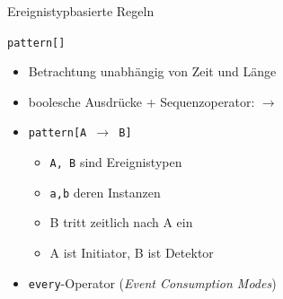 \documentclass[usenames,dvipsnames]{beamer}
\begin{document}
\begin{frame}{Ereignistypbasierte Regeln}


\begin{block}{\centering \texttt{pattern[]}}
    \begin{itemize}
        \item Betrachtung unabhängig von Zeit und Länge
        \vspace{0.2cm}
        \item boolesche Ausdrücke + Sequenzoperator: $\rightarrow$
        \vspace{0.2cm}
        \item \texttt{pattern[A $\rightarrow$ B]}
        \begin{itemize}
            \item \texttt{A, B} sind Ereignistypen
            \item \texttt{a,b} deren Instanzen
            \item B tritt zeitlich nach A ein
            \item A ist Initiator, B ist Detektor 
        \end{itemize}
    \vspace{0.2cm}
        \item \texttt{every}-Operator (\textit{Event Consumption Modes})
    \end{itemize}
\end{block}

\end{frame}
\end{document}
